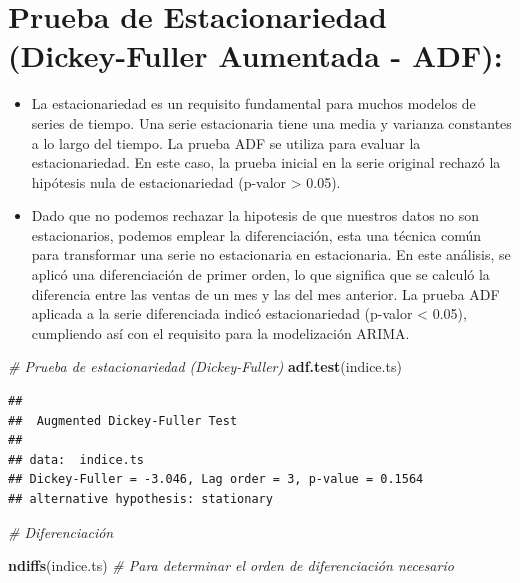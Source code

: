 \documentclass[
]{book}
\newenvironment{Shaded}{\begin{snugshade}}{\end{snugshade}}
\newcommand{\CommentTok}[1]{\textcolor[rgb]{0.56,0.35,0.01}{\textit{#1}}}
\newcommand{\FunctionTok}[1]{\textcolor[rgb]{0.13,0.29,0.53}{\textbf{#1}}}
\newcommand{\NormalTok}[1]{#1}
\begin{document}
\section{Prueba de Estacionariedad (Dickey-Fuller Aumentada - ADF):}\label{prueba-de-estacionariedad-dickey-fuller-aumentada---adf}

\begin{itemize}
\item
  La estacionariedad es un requisito fundamental para muchos modelos de series de tiempo. Una serie estacionaria tiene una media y varianza constantes a lo largo del tiempo. La prueba ADF se utiliza para evaluar la estacionariedad. En este caso, la prueba inicial en la serie original rechazó la hipótesis nula de estacionariedad (p-valor \textgreater{} 0.05).
\item
  Dado que no podemos rechazar la hipotesis de que nuestros datos no son estacionarios, podemos emplear la diferenciación, esta una técnica común para transformar una serie no estacionaria en estacionaria. En este análisis, se aplicó una diferenciación de primer orden, lo que significa que se calculó la diferencia entre las ventas de un mes y las del mes anterior. La prueba ADF aplicada a la serie diferenciada indicó estacionariedad (p-valor \textless{} 0.05), cumpliendo así con el requisito para la modelización ARIMA.
\end{itemize}

\begin{Shaded}
\begin{Highlighting}[]
\CommentTok{\# Prueba de estacionariedad (Dickey{-}Fuller)}
\FunctionTok{adf.test}\NormalTok{(indice.ts)}
\end{Highlighting}
\end{Shaded}

\begin{verbatim}
## 
##  Augmented Dickey-Fuller Test
## 
## data:  indice.ts
## Dickey-Fuller = -3.046, Lag order = 3, p-value = 0.1564
## alternative hypothesis: stationary
\end{verbatim}

\begin{Shaded}
\begin{Highlighting}[]
\CommentTok{\# Diferenciación}

\FunctionTok{ndiffs}\NormalTok{(indice.ts) }\CommentTok{\# Para determinar el orden de diferenciación necesario}
\end{Highlighting}
\end{Shaded}
\end{document}
